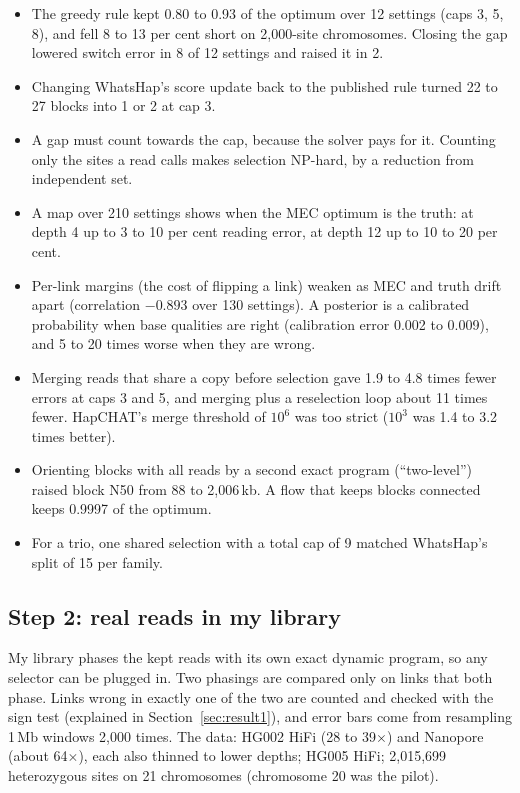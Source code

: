 \documentclass[11pt]{article}
\begin{document}
\begin{itemize}
\item The greedy rule kept 0.80 to 0.93 of the optimum over 12 settings
  (caps 3, 5, 8), and fell 8 to 13 per cent short on 2{,}000-site
  chromosomes. Closing the gap lowered switch error in 8 of 12 settings and
  raised it in 2.
\item Changing WhatsHap's score update back to the published rule turned 22
  to 27 blocks into 1 or 2 at cap 3.
\item A gap must count towards the cap, because the solver pays for it.
  Counting only the sites a read calls makes selection NP-hard, by a
  reduction from independent set.
\item A map over 210 settings shows when the MEC optimum is the truth: at
  depth 4 up to 3 to 10 per cent reading error, at depth 12 up to 10 to 20
  per cent.
\item Per-link margins (the cost of flipping a link) weaken as MEC and truth
  drift apart (correlation $-0.893$ over 130 settings). A posterior is a
  calibrated probability when base qualities are right (calibration error
  0.002 to 0.009), and 5 to 20 times worse when they are wrong.
\item Merging reads that share a copy before selection gave 1.9 to 4.8
  times fewer errors at caps 3 and 5, and merging plus a reselection loop
  about 11 times fewer. HapCHAT's merge threshold of $10^6$ was too strict
  ($10^3$ was 1.4 to 3.2 times better).
\item Orienting blocks with all reads by a second exact program
  (\enquote{two-level}) raised block N50 from 88 to 2{,}006\,kb. A flow that
  keeps blocks connected keeps 0.9997 of the optimum.
\item For a trio, one shared selection with a total cap of 9 matched
  WhatsHap's split of 15 per family.
\end{itemize}

\subsection{Step 2: real reads in my library}

My library phases the kept reads with its own exact dynamic program, so
any selector can be plugged in. Two phasings are compared only on links that
both phase. Links wrong in exactly one of the two are counted and checked
with the sign test (explained in Section~\ref{sec:result1}), and error bars
come from resampling 1\,Mb windows 2{,}000 times. The data: HG002 HiFi (28 to
39$\times$) and Nanopore (about 64$\times$), each also thinned to lower
depths; HG005 HiFi; 2{,}015{,}699 heterozygous sites on 21 chromosomes
(chromosome 20 was the pilot).
\end{document}
